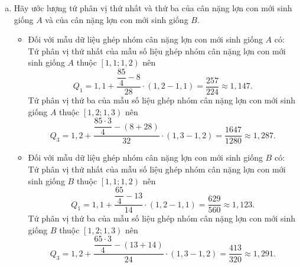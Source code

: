 \begin{bt}
{\begin{enumerate}[a)]
			Trung vị của mẫu số liệu ghép nhóm cân nặng của lợn con  giống  $ B $ là $$M_e=1{,}2+\dfrac{\dfrac{65}{2}-(13+14)}{24}\cdot (1{,}3-1{,}2)=\dfrac{587}{480}\approx 1{,}22.$$
			Suy ra trung vị của mẫu số liệu ghép nhóm cân nặng của của lợn con  giống  $ A $ bằng trung vị của mẫu số liệu ghép nhóm cân nặng của của lợn con  giống $ B $.
			\item Hãy ước lượng tứ phân vị thứ nhất và thứ ba của cân nặng lợn con mới sinh giống $ A $ và của cân nặng lợn con mới sinh giống $ B $.
			\begin{itemize}
				\item Đối với mẫu dữ liệu ghép nhóm cân nặng lợn con mới sinh giống $ A $ có:\\
				Tứ phân vị thứ nhất của mẫu số liệu ghép nhóm cân nặng lợn con mới sinh giống $ A $ thuộc $ \left[ 1{,}1 ; 1{,}2\right)  $ nên $$ Q_1= 1{,}1+\dfrac{\dfrac{85}{4}-8}{28}\cdot \left( 1{,}2-1{,}1\right)= \dfrac{257}{224}\approx 1{,}147.$$
				Tứ phân vị thứ ba của mẫu số liệu ghép nhóm cân nặng lợn con mới sinh giống $ A $ thuộc $ \left[ 1{,}2 ; 1{,}3\right)  $ nên $$ Q_3= 1{,}2+\dfrac{\dfrac{85\cdot3 }{4}-(8+28)}{32}\cdot \left( 1{,}3-1{,}2\right)= \dfrac{1647}{1280}\approx 1{,}287.$$
				\item Đối với mẫu dữ liệu ghép nhóm cân nặng lợn con mới sinh giống $ B $ có:\\
				Tứ phân vị thứ nhất của mẫu số liệu ghép nhóm cân nặng lợn con mới sinh giống $ B $ thuộc $ \left[ 1{,}1 ; 1{,}2\right)  $ nên $$ Q_1= 1{,}1+\dfrac{\dfrac{65}{4}-13}{14}\cdot \left( 1{,}2-1{,}1\right)= \dfrac{629}{560}\approx 1{,}123.$$	
				Tứ phân vị thứ ba của mẫu số liệu ghép nhóm cân nặng lợn con mới sinh giống $ B $ thuộc $ \left[ 1{,}2 ; 1{,}3\right)  $ nên $$ Q_3= 1{,}2+\dfrac{\dfrac{65\cdot 3}{4}-(13+14)}{24}\cdot \left( 1{,}3-1{,}2\right)= \dfrac{413}{320}\approx 1{,}291.$$	
			\end{itemize}
		\end{enumerate}		
	}
\end{bt}


